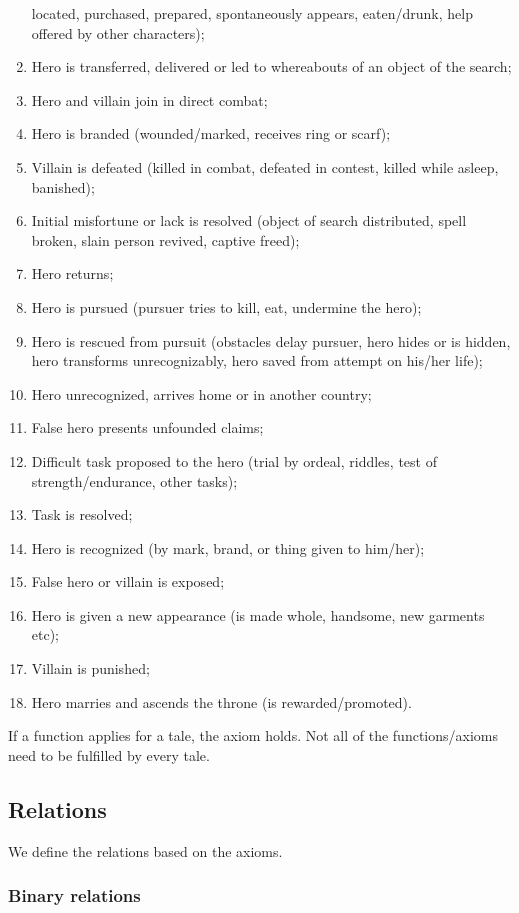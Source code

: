 \documentclass[10pt,a4paper]{article}
\begin{document}
\begin{enumerate}
located, purchased, prepared, spontaneously appears, eaten/drunk,
help offered by other characters);
 \item  Hero is transferred, delivered or led to whereabouts of an
object of the search;
	\item  Hero and villain join in direct combat;
	\item  Hero is branded (wounded/marked, receives ring or scarf);
	 \item  Villain is defeated (killed in combat, defeated in contest, killed
while asleep, banished);
 	\item  Initial misfortune or lack is resolved (object of search
distributed, spell broken, slain person revived, captive freed);
 	\item  Hero returns;
	\item  Hero is pursued (pursuer tries to kill, eat, undermine the hero);
	\item   Hero is rescued from pursuit (obstacles delay pursuer, hero
hides or is hidden, hero transforms unrecognizably, hero saved
from attempt on his/her life);
	\item  Hero unrecognized, arrives home or in another country;
 	\item  False hero presents unfounded claims;
 	\item  Difficult task proposed to the hero (trial by ordeal, riddles, test
of strength/endurance, other tasks);
 	\item  Task is resolved;
 \item  Hero is recognized (by mark, brand, or thing given to
him/her);
 \item False hero or villain is exposed;
 \item  Hero is given a new appearance (is made whole, handsome,
new garments etc);
 \item Villain is punished;
 \item  Hero marries and ascends the throne (is rewarded/promoted).
\end{enumerate}

If a function applies for a tale, the axiom holds. Not all of the functions/axioms need to be fulfilled by every tale.    

\subsection{Relations}
We define the relations based on the axioms. 
	\subsubsection{Binary relations} 
\end{document}
